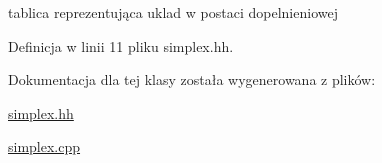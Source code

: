 tablica reprezentująca uklad w postaci dopelnieniowej 



Definicja w linii 11 pliku simplex.\-hh.



Dokumentacja dla tej klasy została wygenerowana z plików\-:\begin{DoxyCompactItemize}
\item 
\hyperlink{simplex_8hh}{simplex.\-hh}\item 
\hyperlink{simplex_8cpp}{simplex.\-cpp}\end{DoxyCompactItemize}
